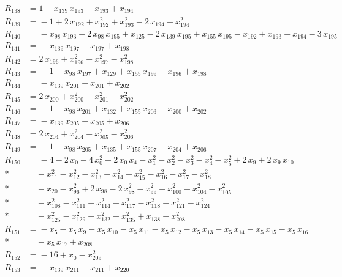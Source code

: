 \begin{align*}
R_{138} &={} 1 -x_{139}\,x_{193} -x_{193} +x_{194} \\[3pt]
R_{139} &={} -1 +2\,x_{192} +x_{192}^{2} +x_{193}^{2} -2\,x_{194} -x_{194}^{2} \\[3pt]
R_{140} &={} -x_{98}\,x_{193} +2\,x_{98}\,x_{195} +x_{125} -2\,x_{139}\,x_{195} +x_{155}\,x_{195} -x_{192} +x_{193} +x_{194} -3\,x_{195} \\[3pt]
R_{141} &={} -x_{139}\,x_{197} -x_{197} +x_{198} \\[3pt]
R_{142} &={} 2\,x_{196} +x_{196}^{2} +x_{197}^{2} -x_{198}^{2} \\[3pt]
R_{143} &={} -1 -x_{98}\,x_{197} +x_{129} +x_{155}\,x_{199} -x_{196} +x_{198} \\[3pt]
R_{144} &={} -x_{139}\,x_{201} -x_{201} +x_{202} \\[3pt]
R_{145} &={} 2\,x_{200} +x_{200}^{2} +x_{201}^{2} -x_{202}^{2} \\[3pt]
R_{146} &={} -1 -x_{98}\,x_{201} +x_{132} +x_{155}\,x_{203} -x_{200} +x_{202} \\[3pt]
R_{147} &={} -x_{139}\,x_{205} -x_{205} +x_{206} \\[3pt]
R_{148} &={} 2\,x_{204} +x_{204}^{2} +x_{205}^{2} -x_{206}^{2} \\[3pt]
R_{149} &={} -1 -x_{98}\,x_{205} +x_{135} +x_{155}\,x_{207} -x_{204} +x_{206} \\[3pt]
R_{150} &={} -4 -2\,x_{0} -4\,x_{0}^{2} -2\,x_{0}\,x_{4} -x_{1}^{2} -x_{2}^{2} -x_{3}^{2} -x_{4}^{2} -x_{5}^{2} +2\,x_{9} +2\,x_{9}\,x_{10} \\*
&\quad{} -x_{11}^{2} -x_{12}^{2} -x_{13}^{2} -x_{14}^{2} -x_{15}^{2} -x_{16}^{2} -x_{17}^{2} -x_{18}^{2} \\*
&\quad{} -x_{20} -x_{96}^{2} +2\,x_{98} -2\,x_{98}^{2} -x_{99}^{2} -x_{100}^{2} -x_{104}^{2} -x_{105}^{2} \\*
&\quad{} -x_{108}^{2} -x_{111}^{2} -x_{114}^{2} -x_{117}^{2} -x_{118}^{2} -x_{121}^{2} -x_{124}^{2} \\*
&\quad{} -x_{125}^{2} -x_{129}^{2} -x_{132}^{2} -x_{135}^{2} +x_{138} -x_{208}^{2} \\[3pt]
R_{151} &={} -x_{5} -x_{5}\,x_{9} -x_{5}\,x_{10} -x_{5}\,x_{11} -x_{5}\,x_{12} -x_{5}\,x_{13} -x_{5}\,x_{14} -x_{5}\,x_{15} -x_{5}\,x_{16} \\*
&\quad{} -x_{5}\,x_{17} +x_{208} \\[3pt]
R_{152} &={} -16 +x_{0} -x_{209}^{2} \\[3pt]
R_{153} &={} -x_{139}\,x_{211} -x_{211} +x_{220} \\[3pt]

\end{align*}
